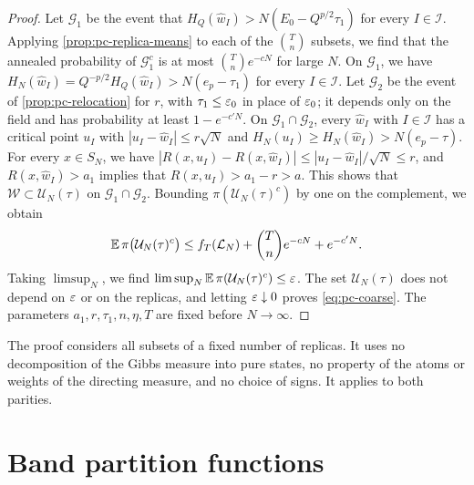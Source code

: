 \begin{proof}
Let $\mathcal G_1$ be the event that $H_Q(\hat w_I)>N(E_0-Q^{p/2}\tau_1)$ for every $I\in\mathcal I$. Applying \cref{prop:pc-replica-means} to each of the $\binom Tn$ subsets, we find that the annealed probability of $\mathcal G_1^c$ is at most $\binom Tne^{-cN}$ for large $N$. On $\mathcal G_1$, we have $H_N(\hat w_I)=Q^{-p/2}H_Q(\hat w_I)>N(e_p-\tau_1)$ for every $I\in\mathcal I$. Let $\mathcal G_2$ be the event of \cref{prop:pc-relocation} for $r$, with $\tau_1\le\varepsilon_0$ in place of $\varepsilon_0$; it depends only on the field and has probability at least $1-e^{-c'N}$. On $\mathcal G_1\cap\mathcal G_2$, every $\hat w_I$ with $I\in\mathcal I$ has a critical point $u_I$ with $|u_I-\hat w_I|\le r\sqrt N$ and $H_N(u_I)\ge H_N(\hat w_I)>N(e_p-\tau)$. For every $x\in S_N$, we have $|R(x,u_I)-R(x,\hat w_I)|\le|u_I-\hat w_I|/\sqrt N\le r$, and $R(x,\hat w_I)>a_1$ implies that $R(x,u_I)>a_1-r>a$. This shows that $\mathcal W\subset\mathcal U_N(\tau)$ on $\mathcal G_1\cap\mathcal G_2$. Bounding $\pi(\mathcal U_N(\tau)^c)$ by one on the complement, we obtain
\[
\mathbb E\,\pi\bigl(\mathcal U_N(\tau)^c\bigr)\le f_T(\mathcal L_N)+\binom Tne^{-cN}+e^{-c'N}.
\]
Taking $\limsup_N$, we find $\limsup_N\mathbb E\,\pi(\mathcal U_N(\tau)^c)\le\varepsilon$. The set $\mathcal U_N(\tau)$ does not depend on $\varepsilon$ or on the replicas, and letting $\varepsilon\downarrow0$ proves \eqref{eq:pc-coarse}. The parameters $a_1,r,\tau_1,n,\eta,T$ are fixed before $N\to\infty$.
\end{proof}

The proof considers all subsets of a fixed number of replicas. It uses no decomposition of the Gibbs measure into pure states, no property of the atoms or weights of the directing measure, and no choice of signs. It applies to both parities.

\section{Band partition functions}\label{sec:pc-bands}

